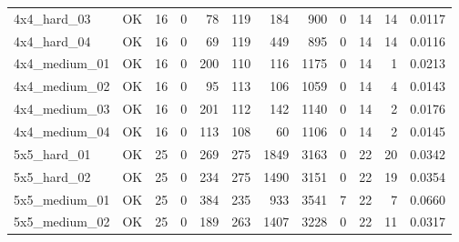 \begin{tabular}{l l r r r r r r r r r r }
4x4\_hard\_03 & OK & 16 & 0 & 78 & 119 & 184 & 900 & 0 & 14 & 14 & 0.0117 \\
4x4\_hard\_04 & OK & 16 & 0 & 69 & 119 & 449 & 895 & 0 & 14 & 14 & 0.0116 \\
4x4\_medium\_01 & OK & 16 & 0 & 200 & 110 & 116 & 1175 & 0 & 14 & 1 & 0.0213 \\
4x4\_medium\_02 & OK & 16 & 0 & 95 & 113 & 106 & 1059 & 0 & 14 & 4 & 0.0143 \\
4x4\_medium\_03 & OK & 16 & 0 & 201 & 112 & 142 & 1140 & 0 & 14 & 2 & 0.0176 \\
4x4\_medium\_04 & OK & 16 & 0 & 113 & 108 & 60 & 1106 & 0 & 14 & 2 & 0.0145 \\
5x5\_hard\_01 & OK & 25 & 0 & 269 & 275 & 1849 & 3163 & 0 & 22 & 20 & 0.0342 \\
5x5\_hard\_02 & OK & 25 & 0 & 234 & 275 & 1490 & 3151 & 0 & 22 & 19 & 0.0354 \\
5x5\_medium\_01 & OK & 25 & 0 & 384 & 235 & 933 & 3541 & 7 & 22 & 7 & 0.0660 \\
5x5\_medium\_02 & OK & 25 & 0 & 189 & 263 & 1407 & 3228 & 0 & 22 & 11 & 0.0317 \\
\hline
\end{tabular}
